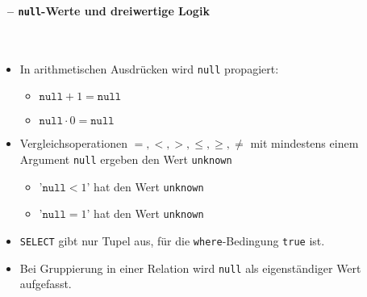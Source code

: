 \begin{frame}\frametitle{\insertsection}
\framesubtitle{\insertsubsection\ -- \texttt{null}-Werte und dreiwertige Logik}
\\[4pt]
\begin{itemize}
	\item In arithmetischen Ausdr\"ucken wird \texttt{null} propagiert: 
	\begin{itemize}
		\item $\texttt{null} + 1 = \texttt{null}$
		\item $\texttt{null} \cdot 0 = \texttt{null}$		
	\end{itemize}
  \item Vergleichsoperationen $=,<,>,\le,\ge,\ne$ mit mindestens einem Argument \texttt{null}
  ergeben den Wert \texttt{unknown}
  	\begin{itemize}
	   \item '$\texttt{null} < 1$' hat den Wert \texttt{unknown} 
	   \item '$\texttt{null} = 1$' hat den Wert \texttt{unknown} 
    \end{itemize}
  \item \texttt{SELECT} gibt nur Tupel aus, f\"ur die \texttt{where}-Bedingung \texttt{true} ist.
  \item Bei Gruppierung in einer Relation wird \texttt{null} als eigenst\"andiger Wert aufgefasst.
\end{itemize}
\end{frame}

